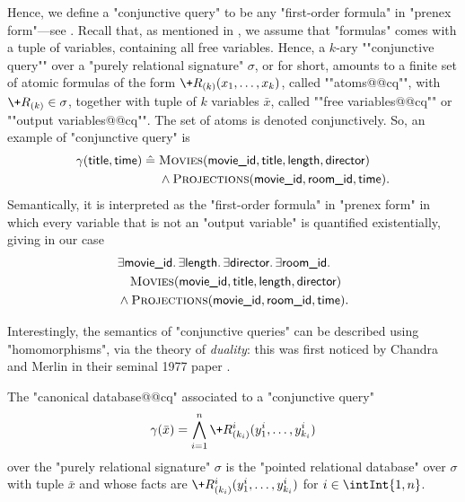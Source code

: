 Hence, we define a \AP"conjunctive query" to be
any "first-order formula" in "prenex form"---see .
Recall that, as mentioned in ,
we assume that "formulas" comes with a tuple of variables,
containing all free variables.
Hence, a $k$-ary \AP""conjunctive query"" over a "purely relational signature" $\sigma$,
or  for short, amounts to a finite set
of atomic formulas of the form $\+R_{(k)}(x_1,\hdots,x_k)$,
called ""atoms@@cq"", with $\+R_{(k)} \in \sigma$,
together with tuple of $k$ variables $\bar x$, called ""free variables@@cq""
or ""output variables@@cq"". The set of atoms is denoted conjunctively.
So, an example of "conjunctive query" is
\begin{align*}
	\gamma(\textsf{title}, \textsf{time}) \mathrel{\hat{=}}\; 
	& \textsc{Movies}(\textsf{movie\_id}, \textsf{title}, \textsf{length}, \textsf{director}) \\
	& \land
	\textsc{Projections}(\textsf{movie\_id}, \textsf{room\_id}, \textsf{time}).
\end{align*} 
Semantically, it is interpreted as the "first-order formula" in "prenex form"
in which every variable that is not an "output variable" is quantified existentially,
giving in our case
\begin{align*}
	& \exists \textsf{movie\_id}.\, 
	\exists \textsf{length}.\, 
	\exists \textsf{director}.\,
	\exists \textsf{room\_id}.\, \\
	& \hphantom{\land~} \textsc{Movies}(\textsf{movie\_id}, \textsf{title}, \textsf{length}, \textsf{director}) \\
	& \land
	\textsc{Projections}(\textsf{movie\_id}, \textsf{room\_id}, \textsf{time}).
\end{align*} 

Interestingly, the semantics of "conjunctive queries" can be described using "homomorphisms",
via the theory of \emph{duality}: this was first noticed by Chandra and Merlin in
their seminal 1977 paper \cite{ChandraMerlin1977Implementation}.
\begin{definition}
	The "canonical database@@cq" associated to a "conjunctive query"
	\[
		\gamma(\bar x) = \bigwedge_{i=1}^n \+R^i_{(k_i)}(y^i_1,\dotsc,y^i_{k_i})
	\]
	over the "purely relational signature" $\sigma$ is the "pointed relational database"
	over $\sigma$ with tuple $\bar x$ and whose facts are
	$\+R^i_{(k_i)}(y^i_1,\dotsc,y^i_{k_i})$ for $i \in \intInt{1,n}$.
\end{definition}


